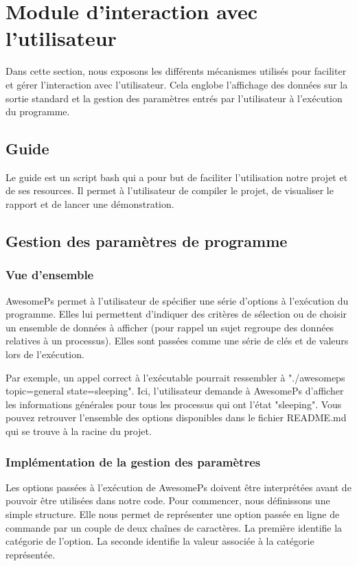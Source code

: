 \section{Module d'interaction avec l’utilisateur}
Dans cette section, nous exposons les différents mécanismes utilisés pour faciliter et gérer l’interaction avec l’utilisateur. Cela englobe l’affichage des données sur la sortie standard et la gestion des paramètres entrés par l’utilisateur à l’exécution du programme.

\subsection{Guide}
Le guide est un script bash qui a pour but de faciliter l'utilisation notre projet et de ses resources. Il permet à l'utilisateur de compiler le projet, de visualiser le rapport et de lancer une démonstration.

\subsection{Gestion des paramètres de programme}
\subsubsection{Vue d'ensemble}
AwesomePs permet à l'utilisateur de spécifier une série d'options à l'exécution du programme. Elles lui permettent d'indiquer des critères de sélection ou de choisir un ensemble de données à afficher (pour rappel un sujet regroupe des données relatives à un processus). Elles sont passées comme une série de clés et de valeurs lors de l'exécution.

Par exemple, un appel correct à l'exécutable pourrait ressembler à "./awesomeps topic=general state=sleeping". Ici, l'utilisateur demande à AwesomePs d'afficher les informations générales pour tous les processus qui ont l'état "sleeping". Vous pouvez retrouver l'ensemble des options disponibles dans le fichier README.md qui se trouve à la racine du projet.

\subsubsection{Implémentation de la gestion des paramètres}
Les options passées à l'exécution de AwesomePs doivent être interprétées avant de pouvoir être utilisées dans notre code. Pour commencer, nous définissons une simple structure. Elle nous permet de représenter une option passée en ligne de commande par un couple de deux chaînes de caractères. La première identifie la catégorie de l'option. La seconde identifie la valeur associée à la catégorie représentée.

